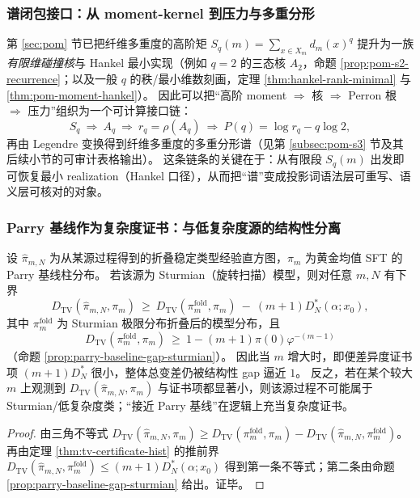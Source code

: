 \subsubsection{谱闭包接口：从 moment-kernel 到压力与多重分形}
\begin{remark}\label{rem:pom-moment-kernel-chain}
第 \ref{sec:pom} 节已把纤维多重度的高阶矩
\(
S_q(m)=\sum_{x\in X_m}d_m(x)^q
\)
提升为一族\emph{有限维碰撞核}与 Hankel 最小实现（例如 \(q=2\) 的三态核 \(A_2\)，命题 \ref{prop:pom-s2-recurrence}；以及一般 \(q\) 的秩/最小维数刻画，定理 \ref{thm:hankel-rank-minimal} 与 \ref{thm:pom-moment-hankel}）。
因此可以把“高阶 moment \(\Rightarrow\) 核 \(\Rightarrow\) Perron 根 \(\Rightarrow\) 压力”组织为一个可计算接口链：
$$
S_q\ \Longrightarrow\ A_q\ \Longrightarrow\ r_q=\rho(A_q)\ \Longrightarrow\ P(q)=\log r_q-q\log 2,
$$
再由 Legendre 变换得到纤维多重度的多重分形谱（见第 \ref{subsec:pom-s3} 节及其后续小节的可审计表格输出）。
这条链条的关键在于：从有限段 \(S_q(m)\) 出发即可恢复最小 realization（Hankel 口径），从而把“谱”变成投影词语法层可重写、语义层可核对的对象。
\end{remark}

\subsubsection{Parry 基线作为复杂度证书：与低复杂度源的结构性分离}
\begin{corollary}[折叠直方图 \texorpdfstring{$\Rightarrow$}{=>} 复杂度证书]\label{cor:pom-parry-complexity-detector}
设 \(\hat{\pi}_{m,N}\) 为从某源过程得到的折叠稳定类型经验直方图，\(\pi_m\) 为黄金均值 SFT 的 Parry 基线柱分布。
若该源为 Sturmian（旋转扫描）模型，则对任意 \(m,N\) 有下界
$$
D_{\mathrm{TV}}(\hat{\pi}_{m,N},\pi_m)
\ \ge\
D_{\mathrm{TV}}(\pi_m^{\mathrm{fold}},\pi_m)\ -\ (m+1)D_N^*(\alpha;x_0),
$$
其中 \(\pi_m^{\mathrm{fold}}\) 为 Sturmian 极限分布折叠后的模型分布，且
$$
D_{\mathrm{TV}}(\pi_m^{\mathrm{fold}},\pi_m)\ \ge\ 1-(m+1)\pi(0)\varphi^{-(m-1)}
$$
（命题 \ref{prop:parry-baseline-gap-sturmian}）。
因此当 \(m\) 增大时，即便差异度证书项 \((m+1)D_N^*\) 很小，整体总变差仍被结构性 gap 逼近 \(1\)。
反之，若在某个较大 \(m\) 上观测到 \(D_{\mathrm{TV}}(\hat{\pi}_{m,N},\pi_m)\) 与证书项都显著小，则该源过程不可能属于 Sturmian/低复杂度类；“接近 Parry 基线”在逻辑上充当复杂度证书。
\end{corollary}
\begin{proof}
由三角不等式
\(
D_{\mathrm{TV}}(\hat{\pi}_{m,N},\pi_m)\ge D_{\mathrm{TV}}(\pi_m^{\mathrm{fold}},\pi_m)-D_{\mathrm{TV}}(\hat{\pi}_{m,N},\pi_m^{\mathrm{fold}})
\)。
再由定理 \ref{thm:tv-certificate-hist} 的推前界
\(
D_{\mathrm{TV}}(\hat{\pi}_{m,N},\pi_m^{\mathrm{fold}})\le (m+1)D_N^*(\alpha;x_0)
\)
得到第一条不等式；第二条由命题 \ref{prop:parry-baseline-gap-sturmian} 给出。证毕。
\end{proof}

